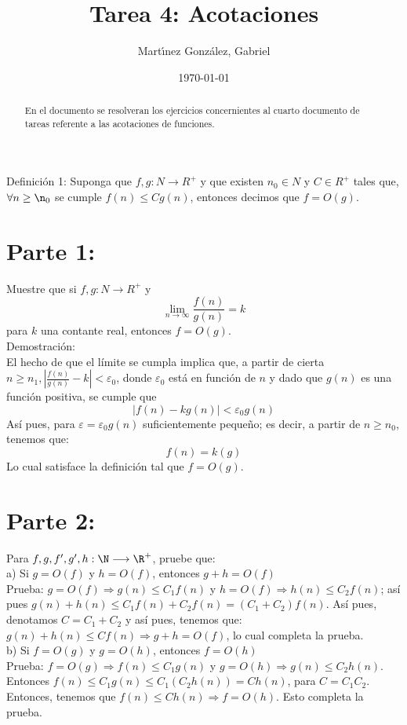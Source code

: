 \documentclass[12pt]{article}
\author{Mart\'{\i}nez Gonz\'alez, Gabriel}
\date{\today}
\title{Tarea 4: Acotaciones}
\begin{document}
\maketitle
\begin{abstract}

	En el documento se resolveran los ejercicios concernientes al cuarto documento de tareas referente a las acotaciones de funciones.	
	
\end{abstract}

Definición 1: Suponga que $f,g:N\longrightarrow R^{+}$ y que existen $n_0\in N$ y $C\in R^{+}$ tales que, $\forall n\geq \n_0$ se cumple $f(n)\leq Cg(n)$, entonces decimos que $f=O(g)$.

\section{Parte 1:}

Muestre que si $f,g:N\longrightarrow R^{+}$ y $$\lim\limits_{n\rightarrow\infty}{\frac{f(n)}{g(n)}}=k$$ para $k$ una contante real, entonces $f=O(g)$.\\

Demostración:\\

El hecho de que el límite se cumpla implica que, a partir de cierta $n\geq n_1, {|{\frac{f(n)}{g(n)}-k}|<\varepsilon_0}$, donde $\varepsilon_0$ está en función de $n$ y dado que $g(n)$ es una funci\'on positiva, se cumple que 
$$|f(n)-kg(n)|<\varepsilon_0 g(n)$$ 
Así pues, para $\varepsilon=\varepsilon_0 g(n)$ suficientemente pequeño; es decir, a partir de $n\geq n_0$, tenemos que:
$$f(n)=k(g)$$
Lo cual satisface la definición tal que $f=O(g)$.

\section{Parte 2:}
Para $f,g,f', g', h:\N\longrightarrow\R^{+}$, pruebe que:\\
a) Si $g=O(f)$ y $h=O(f)$, entonces $g+h=O(f)$\\
Prueba: $g=O(f)\Longrightarrow g(n)\leq C_1f(n)$ y $h=O(f)\Longrightarrow h(n)\leq C_2f(n)$; así pues $g(n)+h(n)\leq C_1f(n)+C_2f(n)=(C_1+C_2)f(n)$. Así pues, denotamos $C=C_1+C_2$ y así pues, tenemos que:
$g(n)+h(n)\leq Cf(n)\Longrightarrow g+h=O(f)$, lo cual completa la prueba.\\

b) Si $f=O(g)$ y $g=O(h)$, entonces $f=O(h)$\\
Prueba: $f=O(g)\Longrightarrow f(n)\leq C_1g(n)$ y $g=O(h)\Longrightarrow g(n)\leq C_2h(n)$. Entonces 
$f(n)\leq C_1g(n)\leq C_1(C_2h(n))=Ch(n)$, para $C=C_1C_2$. Entonces, tenemos que $f(n)\leq Ch(n)\Longrightarrow f=O(h)$. Esto completa la prueba. \\
\end{document}
